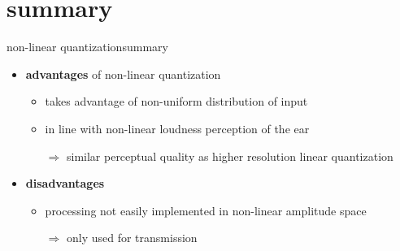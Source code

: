 	\section{summary}	
		\begin{frame}{non-linear quantization}{summary}
            \begin{itemize}
                \item \textbf{advantages} of non-linear quantization
                    \begin{itemize}
                        \item   takes advantage of non-uniform distribution of input
                        \item   in line with non-linear loudness perception of the ear
                        \item[$\Rightarrow$]    similar perceptual quality as higher resolution linear quantization
                    \end{itemize}
                \bigskip
                \item    \textbf{disadvantages}
                    \begin{itemize}
                        \item   processing not easily implemented in non-linear amplitude space
                        \item[$\Rightarrow$] only used for transmission   
                    \end{itemize}
            \end{itemize}
		\end{frame}
 




